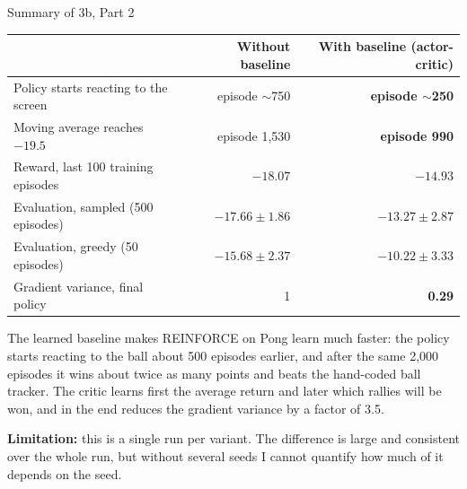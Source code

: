 \FloatBarrier
\begin{summarybox}{Summary of 3b, Part 2}
\begin{tabularx}{\linewidth}{@{}Lrr@{}}
  \toprule
  & \textbf{Without baseline} & \textbf{With baseline (actor-critic)} \\
  \midrule
  Policy starts reacting to the screen & episode $\sim$750 & \textbf{episode $\sim$250} \\
  Moving average reaches $-19.5$ & episode 1,530 & \textbf{episode 990} \\
  Reward, last 100 training episodes & $-18.07$ & $\mathbf{-14.93}$ \\
  Evaluation, sampled (500 episodes) & $-17.66 \pm 1.86$ & $\mathbf{-13.27 \pm 2.87}$ \\
  Evaluation, greedy (50 episodes) & $-15.68 \pm 2.37$ & $\mathbf{-10.22 \pm 3.33}$ \\
  Gradient variance, final policy & 1 & \textbf{0.29} \\
  \bottomrule
\end{tabularx}

\medskip
The learned baseline makes REINFORCE on Pong learn much faster: the policy starts reacting to the ball about 500 episodes earlier, and after the same 2,000 episodes it wins about twice as many points and beats the hand-coded ball tracker. The critic learns first the average return and later which rallies will be won, and in the end reduces the gradient variance by a factor of 3.5.

\textbf{Limitation:} this is a single run per variant. The difference is large and consistent over the whole run, but without several seeds I cannot quantify how much of it depends on the seed.
\end{summarybox}

